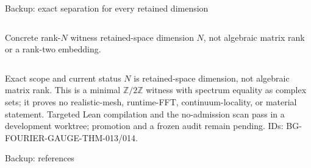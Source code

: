 \documentclass[aspectratio=169,10pt]{beamer}
\begin{document}
\begin{frame}{Backup: exact separation for every retained dimension}
\begin{columns}[T,onlytextwidth]
\begin{block}{Concrete rank-$N$ witness}
        retained-space dimension $N$, not algebraic matrix rank or a rank-two embedding.
      \end{block}
  \end{columns}
  \begin{alertblock}{Exact scope and current status}
    \tiny
    $N$ is retained-space dimension, not algebraic matrix rank. This is a minimal
    $\mathbb Z/2\mathbb Z$ witness with spectrum equality as complex sets; it proves no
    realistic-mesh, runtime-FFT, continuum-locality, or material statement. Targeted Lean
    compilation and the no-admission scan pass in a development worktree; promotion and a
    frozen audit remain pending. IDs: BG-FOURIER-GAUGE-THM-013/014.
  \end{alertblock}
\end{frame}

\begin{frame}[allowframebreaks]{Backup: references}
  \tiny
  \nocite{
    hohenberg1964,kohn1965,perdew1996,giannozzi2009,giannozzi2017,
    giannozzi2020,hamann2013,vansetten2018,monkhorst1976,
    wannier1937,kohn1959,desCloizeaux1964,marzari1997,souza2001,marzari2012,
    mostofi2008,pizzi2020,mustafa2015,cances2017,damle2018,vitale2020,brouder2007,
    bjork1973,schonemann1966,higham1986,davis1970,hornJohnson2013,
    golubVanLoan2013,shankar1994,teschl2014,strikwerda2004,
    slater1954,vogl1983,starrost1996,stiles1997,klimeck2000,
    boykinKlimeckOyafuso2004,wangEtAl2021,zhangEtAl2022,schwadeEtAl2026,
    luttingerKohn1955,kittel2004,yuCardona2010,rubel2021effectiveMass,
    feshbach1958,feshbach1962,lowdin1962,bravyi2011,benzi2013,prodanKohn2005,
    rudin1976,milaneseEtAl1996,neumaier2004,mooreKearfottCloud2009,
    kosterSlater1954impurity,kohnLuttinger1955donor,nakamuraTadano2021,
    freysoldt2014,sandve2013,coveney2021reliability,ye2021uqPatterns,
    bect2021discretization,mathlib2020}
  \printbibliography[heading=none]
\end{frame}
\end{document}
